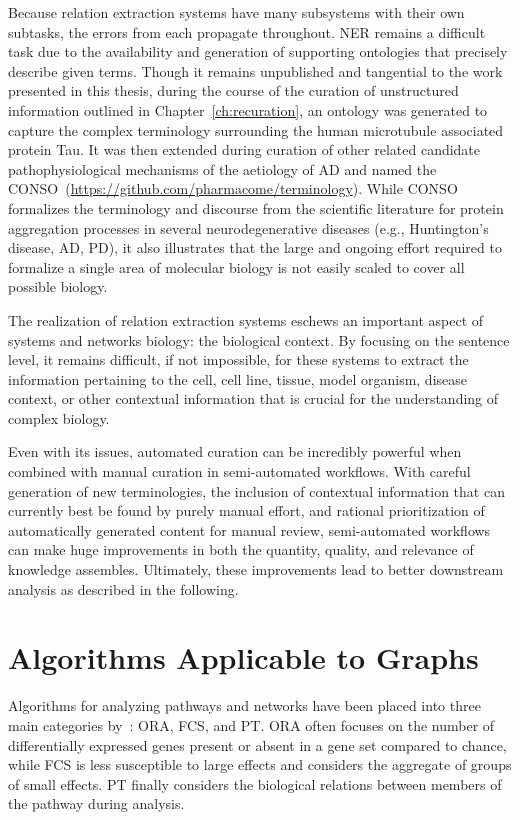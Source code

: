 Because relation extraction systems have many subsystems with their own subtasks, the errors from each propagate throughout.
\ac{NER} remains a difficult task due to the availability and generation of supporting ontologies that precisely describe given terms.
Though it remains unpublished and tangential to the work presented in this thesis, during the course of the curation of unstructured information outlined in Chapter~\autoref{ch:recuration}, an ontology was generated to capture the complex terminology surrounding the human microtubule associated protein Tau.
It was then extended during curation of other related candidate pathophysiological mechanisms of the aetiology of \ac{AD} and named the \ac{CONSO}~(\url{https://github.com/pharmacome/terminology}).
While \ac{CONSO} formalizes the terminology and discourse from the scientific literature for protein aggregation processes in several neurodegenerative diseases (e.g., Huntington's disease, \ac{AD}, \ac{PD}), it also illustrates that the large and ongoing effort required to formalize a single area of molecular biology is not easily scaled to cover all possible biology.

The realization of relation extraction systems eschews an important aspect of systems and networks biology: the biological context.
By focusing on the sentence level, it remains difficult, if not impossible, for these systems to extract the information pertaining to the cell, cell line, tissue, model organism, disease context, or other contextual information that is crucial for the understanding of complex biology.

Even with its issues, automated curation can be incredibly powerful when combined with manual curation in semi-automated workflows.
With careful generation of new terminologies, the inclusion of contextual information that can currently best be found by purely manual effort, and rational prioritization of automatically generated content for manual review, semi-automated workflows can make huge improvements in both the quantity, quality, and relevance of knowledge assembles.
Ultimately, these improvements lead to better downstream analysis as described in the following.

\section{Algorithms Applicable to Graphs}
\label{sec:algorithms}

Algorithms for analyzing pathways and networks have been placed  into three main categories by~\cite{Khatri2012}: \ac{ORA}, \ac{FCS}, and \ac{PT}.
\ac{ORA} often focuses on the number of differentially expressed genes present or absent in a gene set compared to chance, while \ac{FCS} is less susceptible to large effects and considers the aggregate of groups of small effects.
\ac{PT} finally considers the biological relations between members of the pathway during analysis.

